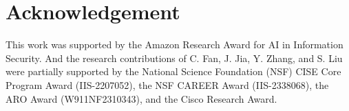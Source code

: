 \section*{Acknowledgement}
This work was supported by the Amazon Research Award for AI in Information Security. And the research contributions of C. Fan, J. Jia, Y. Zhang, and S. Liu were partially supported by the National Science Foundation (NSF) CISE Core Program Award (IIS-2207052), the NSF CAREER Award (IIS-2338068),  the ARO Award (W911NF2310343), and the Cisco Research Award.